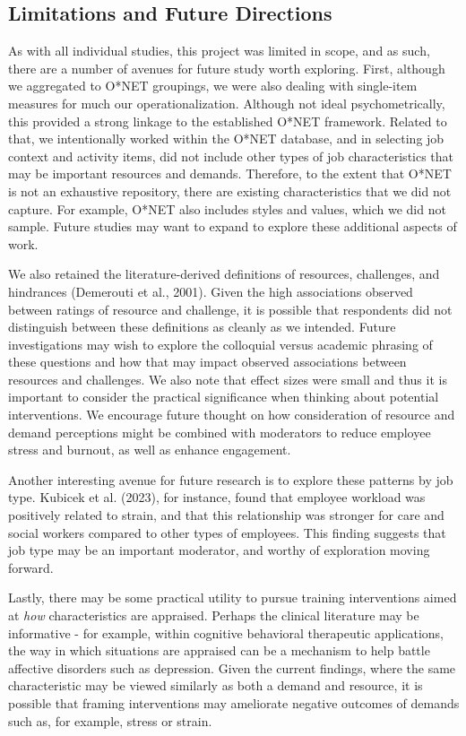 \documentclass[
  man]{apa7}
\begin{document}
\subsection{Limitations and Future Directions}\label{limitations-and-future-directions}

As with all individual studies, this project was limited in scope, and as such, there are a number of avenues for future study worth exploring. First, although we aggregated to O*NET groupings, we were also dealing with single-item measures for much our operationalization. Although not ideal psychometrically, this provided a strong linkage to the established O*NET framework. Related to that, we intentionally worked within the O*NET database, and in selecting job context and activity items, did not include other types of job characteristics that may be important resources and demands. Therefore, to the extent that O*NET is not an exhaustive repository, there are existing characteristics that we did not capture. For example, O*NET also includes styles and values, which we did not sample. Future studies may want to expand to explore these additional aspects of work.

We also retained the literature-derived definitions of resources, challenges, and hindrances (Demerouti et al., 2001). Given the high associations observed between ratings of resource and challenge, it is possible that respondents did not distinguish between these definitions as cleanly as we intended. Future investigations may wish to explore the colloquial versus academic phrasing of these questions and how that may impact observed associations between resources and challenges. We also note that effect sizes were small and thus it is important to consider the practical significance when thinking about potential interventions. We encourage future thought on how consideration of resource and demand perceptions might be combined with moderators to reduce employee stress and burnout, as well as enhance engagement.

Another interesting avenue for future research is to explore these patterns by job type. Kubicek et al. (2023), for instance, found that employee workload was positively related to strain, and that this relationship was stronger for care and social workers compared to other types of employees. This finding suggests that job type may be an important moderator, and worthy of exploration moving forward.

Lastly, there may be some practical utility to pursue training interventions aimed at \emph{how} characteristics are appraised. Perhaps the clinical literature may be informative - for example, within cognitive behavioral therapeutic applications, the way in which situations are appraised can be a mechanism to help battle affective disorders such as depression. Given the current findings, where the same characteristic may be viewed similarly as both a demand and resource, it is possible that framing interventions may ameliorate negative outcomes of demands such as, for example, stress or strain.
\end{document}
